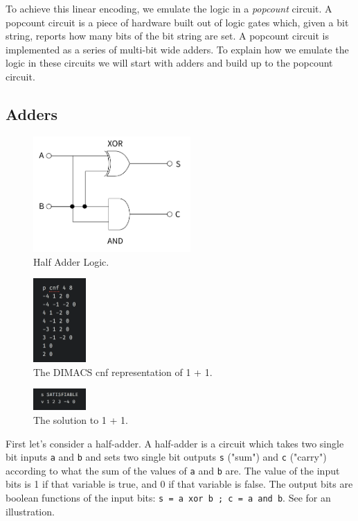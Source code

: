 To achieve this linear encoding, we emulate the logic in a \emph{popcount} circuit. A popcount circuit is a piece of hardware built out of logic gates which, given a bit string, reports how many bits of the bit string are set. A popcount circuit is implemented as a series of multi-bit wide adders. To explain how we emulate the logic in these circuits we will start with adders and build up to the popcount circuit.

\subsection{Adders}

\begin{figure}[t]
    \centerline{\includegraphics[origin=c,width=6cm]{fig_half_adder}}
    \caption{Half Adder Logic.}%
    \label{fig:half_adder}%
\end{figure}

\begin{figure}[t]
    \centerline{\includegraphics[origin=c,width=2cm]{fig_one_plus_one_cnf}}
    \caption{The DIMACS cnf representation of 1 + 1.}%
    \label{fig:one_plus_one_cnf}%
\end{figure}

\begin{figure}[t]
    \centerline{\includegraphics[origin=c,width=2cm]{fig_one_plus_one_sol}}
    \caption{The solution to 1 + 1.}%
    \label{fig:one_plus_one_sol}%
\end{figure}

First let's consider a half-adder. A half-adder is a circuit which takes two single bit inputs \texttt{a} and \texttt{b} and sets two single bit outputs \texttt{s} ("sum") and \texttt{c} ("carry") according to what the sum of the values of \texttt{a} and \texttt{b} are. The value of the input bits is 1 if that variable is true, and 0 if that variable is false. The output bits are boolean functions of the input bits: \texttt{s = a xor b ; c = a and b}. See  for an illustration.

